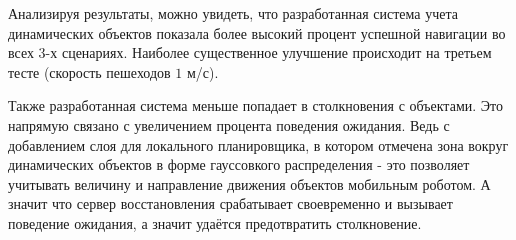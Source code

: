 Анализируя результаты, можно увидеть, что разработанная система учета динамических объектов показала более высокий процент успешной навигации во всех 3-х сценариях. Наиболее существенное улучшение происходит на третьем тесте (скорость пешеходов $1$ м/с).

Также разработанная система меньше попадает в столкновения с объектами. Это напрямую связано с увеличением процента поведения ожидания. Ведь с добавлением слоя для локального планировщика, в котором отмечена зона вокруг динамических объектов в форме гауссовкого распределения - это позволяет учитывать величину и направление движения объектов мобильным роботом. А значит что сервер восстановления срабатывает своевременно и вызывает поведение ожидания, а значит удаётся предотвратить столкновение. 
